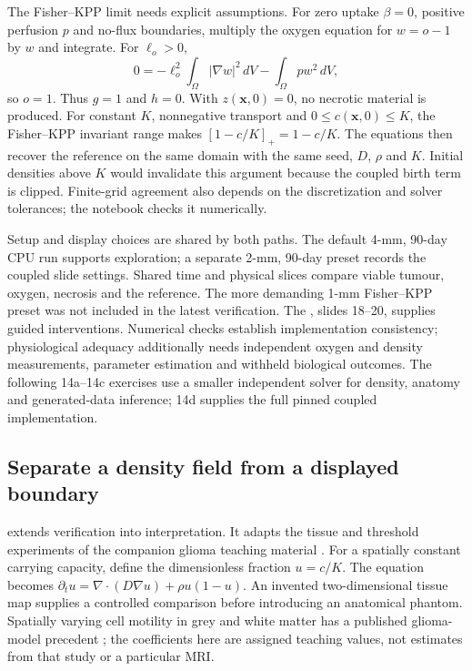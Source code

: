 \documentclass[11pt,a4paper]{article}
\begin{document}
The Fisher--KPP limit needs explicit assumptions. For zero uptake $\beta=0$, positive perfusion $p$ and no-flux boundaries, multiply the oxygen equation for $w=o-1$ by $w$ and integrate. For $\ell_o>0$,
\[
0=-\ell_o^2\int_\Omega|\nabla w|^2\,dV-\int_\Omega p w^2\,dV,
\]
so $o=1$. Thus $g=1$ and $h=0$. With $z(\mathbf x,0)=0$, no necrotic material is produced. For constant $K$, nonnegative transport and $0\leq c(\mathbf x,0)\leq K$, the Fisher--KPP invariant range makes $[1-c/K]_+=1-c/K$. The equations then recover the reference on the same domain with the same seed, $D$, $\rho$ and $K$. Initial densities above $K$ would invalidate this argument because the coupled birth term is clipped. Finite-grid agreement also depends on the discretization and solver tolerances; the notebook checks it numerically.

Setup and display choices are shared by both paths. The default 4-mm, 90-day CPU run supports exploration; a separate 2-mm, 90-day preset records the coupled slide settings. Shared time and physical slices compare viable tumour, oxygen, necrosis and the reference. The more demanding 1-mm Fisher--KPP preset was not included in the latest verification. The , slides 18--20, supplies guided interventions. Numerical checks establish implementation consistency; physiological adequacy additionally needs independent oxygen and density measurements, parameter estimation and withheld biological outcomes. The following 14a--14c exercises use a smaller independent solver for density, anatomy and generated-data inference; 14d supplies the full pinned coupled implementation.

\subsection{Separate a density field from a displayed boundary}

 extends verification into interpretation. It adapts the tissue and threshold experiments of the companion glioma teaching material \citep{gliomateaching2026}. For a spatially constant carrying capacity, define the dimensionless fraction $u=c/K$. The equation becomes $\partial_t u=\nabla\!\cdot(D\nabla u)+\rho u(1-u)$. An invented two-dimensional tissue map supplies a controlled comparison before introducing an anatomical phantom. Spatially varying cell motility in grey and white matter has a published glioma-model precedent \citep{swanson2000}; the coefficients here are assigned teaching values, not estimates from that study or a particular MRI.
\end{document}
